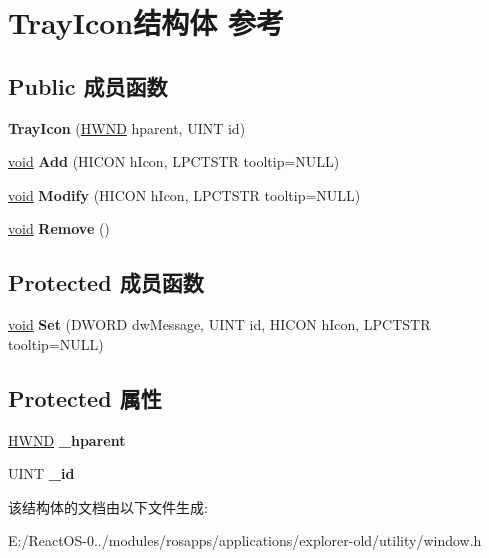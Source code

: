 \hypertarget{struct_tray_icon}{}\section{Tray\+Icon结构体 参考}
\label{struct_tray_icon}
\subsection*{Public 成员函数}
\begin{DoxyCompactItemize}
\item 
\mbox{\label{struct_tray_icon_ab05b13afaf940b7b8269c585adbf7336}} 
{\bfseries Tray\+Icon} (\hyperlink{interfacevoid}{H\+W\+ND} hparent, U\+I\+NT id)
\item 
\mbox{\label{struct_tray_icon_acf4a12c1fb6308e18134e05842f2fde8}} 
\hyperlink{interfacevoid}{void} {\bfseries Add} (H\+I\+C\+ON h\+Icon, L\+P\+C\+T\+S\+TR tooltip=N\+U\+LL)
\item 
\mbox{\label{struct_tray_icon_ab4720e029b4566beccf582e507b488c8}} 
\hyperlink{interfacevoid}{void} {\bfseries Modify} (H\+I\+C\+ON h\+Icon, L\+P\+C\+T\+S\+TR tooltip=N\+U\+LL)
\item 
\mbox{\label{struct_tray_icon_af35ccfd5dc03a47e263f9c1bc94ccc7d}} 
\hyperlink{interfacevoid}{void} {\bfseries Remove} ()
\end{DoxyCompactItemize}
\subsection*{Protected 成员函数}
\begin{DoxyCompactItemize}
\item 
\mbox{\label{struct_tray_icon_a06c1322b2873da6d64b6ac4bb4f969b0}} 
\hyperlink{interfacevoid}{void} {\bfseries Set} (D\+W\+O\+RD dw\+Message, U\+I\+NT id, H\+I\+C\+ON h\+Icon, L\+P\+C\+T\+S\+TR tooltip=N\+U\+LL)
\end{DoxyCompactItemize}
\subsection*{Protected 属性}
\begin{DoxyCompactItemize}
\item 
\mbox{\label{struct_tray_icon_aaf107aed8e7fe696c873d49893e8f62a}} 
\hyperlink{interfacevoid}{H\+W\+ND} {\bfseries \+\_\+hparent}
\item 
\mbox{\label{struct_tray_icon_a6b1609c1e12e1c50078b687a0047777a}} 
U\+I\+NT {\bfseries \+\_\+id}
\end{DoxyCompactItemize}


该结构体的文档由以下文件生成\+:\begin{DoxyCompactItemize}
\item 
E\+:/\+React\+O\+S-\/0../modules/rosapps/applications/explorer-\/old/utility/window.\+h\end{DoxyCompactItemize}
